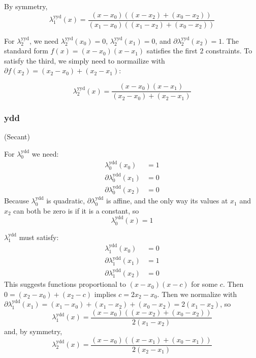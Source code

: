 By symmetry, 
\begin{equation}
\lambda^{\text{yyd}}_1(x) = 
\frac 
{(x - x_0) \left( (x - x_2) + (x_0 - x_2) \right)} 
{(x_1 - x_0) \left( (x_1 - x_2) + (x_0 - x_2) \right)}
\end{equation}

 For $\lambda^{\text{yyd}}_2$, we need 
$\lambda^{\text{yyd}}_2(x_0) = 0$, 
$\lambda^{\text{yyd}}_2(x_1) = 0$, and
$\partial\lambda^{\text{yyd}}_2(x_2) = 1$. 
The standard form $f(x) = (x-x_0) (x-x_1)$ satisfies the first 
$2$ constraints. 
To satisfy the third, we simply need to normailize with
$\partial{f}(x_2) = (x_2 - x_0) + (x_2 - x_1)$:

\begin{equation}
\lambda^{\text{yyd}}_2(x) = 
\frac 
{(x - x_0) (x - x_1)} 
{(x_2 - x_0) + (x_2 - x_1)}
\end{equation}

\subsubsection{ydd}\label{sec:lagrange-ydd}

(Secant)

For $\lambda^{\text{ydd}}_0$ we need:
\begin{align}
\lambda^{\text{ydd}}_0(x_0) & = 1 \\
\partial\lambda^{\text{ydd}}_0(x_1) & = 0 \nonumber \\
\partial\lambda^{\text{ydd}}_0(x_2) & = 0 \nonumber
\end{align}
Because $\lambda^{\text{ydd}}_0$ is quadratic,
$\partial\lambda^{\text{ydd}}_0$ is affine, 
and the only way its values
at $x_1$ and $x_2$ can both be zero is if it is a constant, so 
\begin{equation}
\lambda^{\text{ydd}}_0(x) = 1
\end{equation}

$\lambda^{\text{ydd}}_1$ must satisfy:
\begin{align}
\lambda^{\text{ydd}}_1(x_0) & = 0 \\
\partial\lambda^{\text{ydd}}_1(x_1) & = 1 \nonumber \\
\partial\lambda^{\text{ydd}}_1(x_2) & = 0 \nonumber
\end{align}
This suggests functions proportional to $(x - x_0) (x - c)$ 
for some $c$. Then 
$ 0 = (x_2 - x_0) + (x_2 - c)$
implies $ c = 2 x_2 - x_0$.
Then we normalize with 
$\partial\lambda^{\text{ydd}}_1(x_1) = (x_1 - x_0) + (x_1 - x_2) + (x_0 - x_2) 
= 2 (x_1 - x_2)$, so 
\begin{equation}
\lambda^{\text{ydd}}_1(x) = 
\frac {(x - x_0) \left((x - x_2) + (x_0 - x_2)\right)} 
{2 (x_1 - x_2)}
\end{equation}
and, by symmetry,
\begin{equation}
\lambda^{\text{ydd}}_2(x) = 
\frac {(x - x_0) \left( (x -x_1) + (x_0 - x_1) \right)} 
{2 (x_2 - x_1)}
\end{equation}

